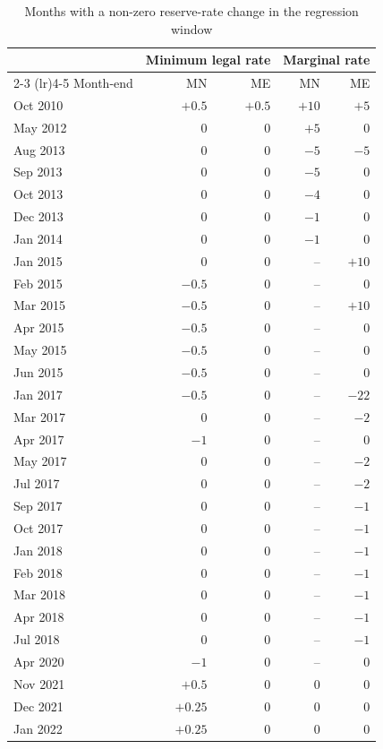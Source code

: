 \documentclass[11pt]{article}
\renewcommand{\_}{\origunderscore\hspace{0pt}}  %
\begin{document}
\begin{table}[!h]
\centering
\small
\caption{Months with a non-zero reserve-rate change in the regression window}
\label{tab:ratechanges}
\begin{tabular}{@{}lrrrr@{}}
\toprule
 & \multicolumn{2}{c}{Minimum legal rate} & \multicolumn{2}{c}{Marginal rate} \\
\cmidrule(lr){2-3} \cmidrule(lr){4-5}
Month-end & MN & ME & MN & ME \\
\midrule
Oct 2010 & $+0.5$ & $+0.5$ & $+10$ & $+5$ \\
May 2012 & 0 & 0 & $+5$ & 0 \\
Aug 2013 & 0 & 0 & $-5$ & $-5$ \\
Sep 2013 & 0 & 0 & $-5$ & 0 \\
Oct 2013 & 0 & 0 & $-4$ & 0 \\
Dec 2013 & 0 & 0 & $-1$ & 0 \\
Jan 2014 & 0 & 0 & $-1$ & 0 \\
Jan 2015 & 0 & 0 & -- & $+10$ \\
Feb 2015 & $-0.5$ & 0 & -- & 0 \\
Mar 2015 & $-0.5$ & 0 & -- & $+10$ \\
Apr 2015 & $-0.5$ & 0 & -- & 0 \\
May 2015 & $-0.5$ & 0 & -- & 0 \\
Jun 2015 & $-0.5$ & 0 & -- & 0 \\
Jan 2017 & $-0.5$ & 0 & -- & $-22$ \\
Mar 2017 & 0 & 0 & -- & $-2$ \\
Apr 2017 & $-1$ & 0 & -- & 0 \\
May 2017 & 0 & 0 & -- & $-2$ \\
Jul 2017 & 0 & 0 & -- & $-2$ \\
Sep 2017 & 0 & 0 & -- & $-1$ \\
Oct 2017 & 0 & 0 & -- & $-1$ \\
Jan 2018 & 0 & 0 & -- & $-1$ \\
Feb 2018 & 0 & 0 & -- & $-1$ \\
Mar 2018 & 0 & 0 & -- & $-1$ \\
Apr 2018 & 0 & 0 & -- & $-1$ \\
Jul 2018 & 0 & 0 & -- & $-1$ \\
Apr 2020 & $-1$ & 0 & -- & 0 \\
Nov 2021 & $+0.5$ & 0 & 0 & 0 \\
Dec 2021 & $+0.25$ & 0 & 0 & 0 \\
Jan 2022 & $+0.25$ & 0 & 0 & 0 \\

\end{tabular}
\end{table}
\end{document}
